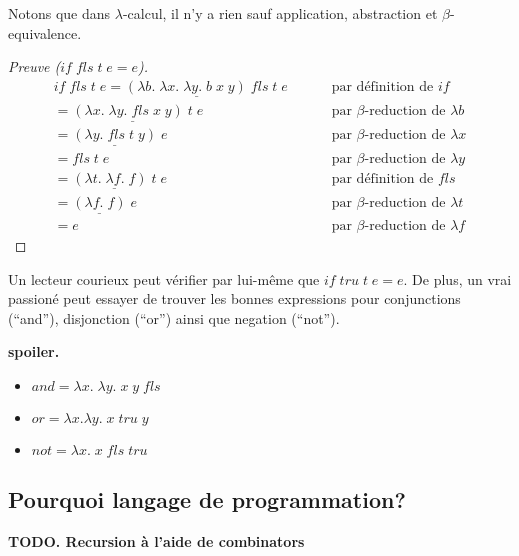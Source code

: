 \documentclass[12pt, a4paper]{article}
\begin{document}
Notons que dans $\lambda$-calcul, il n'y a rien sauf application, abstraction et $\beta$-equivalence.
\begin{proof}[Preuve ($if \; fls \; t \; e = e$)]
	\begin{eqnarray*}
		if \; fls \; t \; e
		= \underline{(\lambda b. \; \lambda x. \; \lambda y. \; b \; x \; y) \; fls} \; t \; e
			& \qquad \text{ par définition de $if$}\\ 
		= \underline{(\lambda x. \; \lambda y. \; fls \; x \; y) \; t} \; e
			& \qquad \text{ par $\beta$-reduction de $\lambda b$}\\
		= \underline{(\lambda y. \; fls \; t \; y)} \; e
			& \qquad \text{ par $\beta$-reduction de $\lambda x$}\\
		= fls \; t \; e
			& \qquad \text{ par $\beta$-reduction de $\lambda y$}\\
		= \underline{(\lambda t. \; \lambda f. \; f) \; t} \; e
			& \qquad \text{ par définition de $fls$}\\
		= \underline{(\lambda f. \; f)} \; e
			& \qquad \text{ par $\beta$-reduction de $\lambda t$}\\
		= e
			& \qquad \text{ par $\beta$-reduction de $\lambda f$}
	\end{eqnarray*}
\end{proof}
Un lecteur courieux peut vérifier par lui-même que $if \; tru \; t \; e = e$.
De plus, un vrai passioné peut essayer de trouver les bonnes expressions pour conjunctions (``and''), disjonction (``or'') ainsi que negation (``not'').

\textbf{spoiler.} 
\begin{itemize}
	\item $and = \lambda x. \; \lambda y. \; x \; y \; fls$
	\item $or = \lambda x. \lambda y. \; x \; tru \; y$
	\item $not = \lambda x. \; x \; fls \; tru$
\end{itemize}

\subsection*{Pourquoi langage de programmation?}
\textbf{TODO. Recursion à l'aide de combinators}
\end{document}
